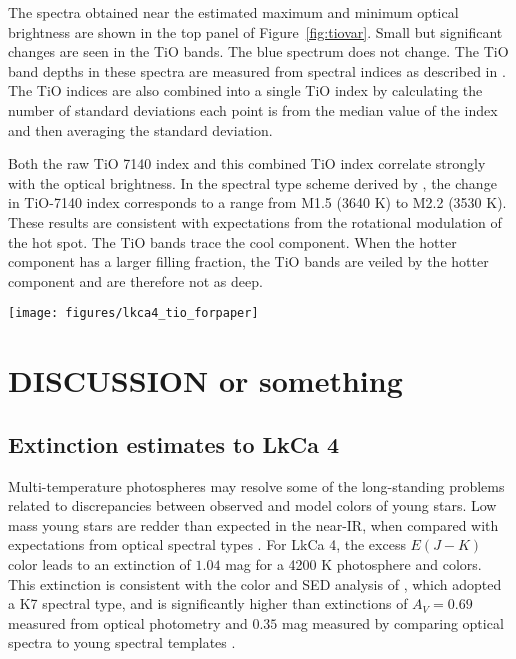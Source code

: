 \documentclass[12pt]{report}
\begin{document}
The spectra obtained near the estimated maximum and minimum optical brightness are shown in the top panel of Figure~\ref{fig:tiovar}.  Small but significant changes are seen in the TiO bands.  The blue spectrum does not change.  The TiO band depths in these spectra are measured from spectral indices as described in \citet{herczeg14}.  The TiO indices are also combined into a single TiO index by calculating the number of standard deviations each point is from the median value of the index and then averaging the standard deviation.  

Both the raw TiO 7140 index and this combined TiO index correlate strongly with the optical brightness.  In the spectral type scheme derived by \citet{herczeg14}, the change in TiO-7140 index corresponds to a range from M1.5 (3640 K) to M2.2 (3530 K).  These results are consistent with expectations from the rotational modulation of the hot spot.  The TiO bands trace the cool component.  When the hotter component has a larger filling fraction, the TiO bands are veiled by the hotter component and are therefore not as deep.


\begin{figure*}
 \centering
 \texttt{[image: figures/lkca4\_tio\_forpaper]}
 \caption[Variability in TiO bands measured with ESPaDOnS]{Variability in TiO bands measured with ESPaDOnS.  The V-band emission is estimated from fits to the ASAS-SN lightcurve obtained during the same period.  The main panel shows a correlation between V-band magnitude and the TiO-7140 index, while the inset shows a similar correlation with the average of the TiO 6200, CaH 6800, and TiO 7600 indices.}
 \label{fig:tiovar}
\end{figure*}

\section{DISCUSSION or something}



\subsection{Extinction estimates to LkCa 4}

Multi-temperature photospheres may resolve some of the long-standing problems related to discrepancies between observed and model colors of young stars.  Low mass young stars are redder than expected in the near-IR, when compared with expectations from optical spectral types \citep[e.g.][]{tottle15}.  For LkCa 4, the excess $E(J-K)$ color leads to an extinction of $1.04$ mag for a 4200 K photosphere and \citep{pecaut13} colors.  This extinction is consistent with the color and SED analysis of \citet{furlan06}, which adopted a K7 spectral type, and is significantly higher than extinctions of $A_V=0.69$ measured from optical photometry \citep{kenyon95} and $0.35$ mag measured by comparing optical spectra to young spectral templates \citep{herczeg14}.  
\end{document}
